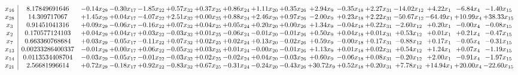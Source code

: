 \documentclass[9pt]{article}
\begin{document}
 \[\begin{array}{c| c c@{\hskip 2pt} c@{\hskip 2pt} c@{\hskip 2pt} c@{\hskip 2pt} c@{\hskip 2pt} c@{\hskip 2pt} c@{\hskip 2pt} c@{\hskip 2pt} c@{\hskip 2pt} c@{\hskip 2pt} c@{\hskip 2pt} c@{\hskip 2pt} c@{\hskip 2pt} c@{\hskip 2pt} c@{\hskip 2pt} }
 x_{16}   &  8.17849691646 & -0.14 x_{29} & -0.30 x_{17} & -1.85 x_{22} & +  0.57 x_{32} & +  0.37 x_{25} & +  0.86 x_{24} & +  1.11 x_{20} & +  0.35 x_{26} & +  2.94 x_{9} & -0.35 x_{18} & +  2.27 x_{31} & -14.02 x_{12} & +  4.22 x_{1} & -6.84 x_{4} & -1.40 x_{15}\\
 x_{28}   &  14.309717067 & +  1.45 x_{29} & +  0.04 x_{17} & -4.07 x_{22} & +  2.51 x_{32} & +  0.00 x_{25} & +  0.88 x_{24} & +  2.46 x_{20} & +  0.97 x_{26} & -2.00 x_{9} & +  0.23 x_{18} & +  2.22 x_{31} & -50.67 x_{12} & -64.49 x_{1} & + 10.99 x_{4} & + 38.33 x_{15}\\
 x_{3}   &  0.91451041316 & +  0.09 x_{29} & -0.06 x_{17} & -0.16 x_{22} & +  0.07 x_{32} & +  0.04 x_{25} & +  0.05 x_{24} & +  0.20 x_{20} & +  0.00 x_{26} & +  1.34 x_{9} & -0.04 x_{18} & +  0.22 x_{31} & -2.60 x_{12} & +  0.20 x_{1} & -0.00 x_{4} & -0.08 x_{15}\\
 x_{2}   &  0.170577124103 & +  0.04 x_{29} & +  0.04 x_{17} & +  0.03 x_{22} & -0.03 x_{32} & +  0.01 x_{25} & -0.06 x_{24} & -0.01 x_{20} & -0.01 x_{26} & +  0.50 x_{9} & +  0.04 x_{18} & +  0.01 x_{31} & +  0.53 x_{12} & +  0.01 x_{1} & +  0.21 x_{4} & -0.47 x_{15}\\
 x_{7}   &  0.663360768684 & +  0.03 x_{29} & -0.05 x_{17} & -0.11 x_{22} & +  0.07 x_{32} & +  0.02 x_{25} & +  0.02 x_{24} & +  0.13 x_{20} & -0.02 x_{26} & +  0.59 x_{9} & -0.00 x_{18} & +  0.17 x_{31} & -0.88 x_{12} & +  0.17 x_{1} & -0.05 x_{4} & -0.31 x_{15}\\
 x_{13}   &  0.00233286400337 & -0.01 x_{29} & +  0.00 x_{17} & +  0.06 x_{22} & -0.05 x_{32} & +  0.03 x_{25} & +  0.01 x_{24} & -0.00 x_{20} & -0.01 x_{26} & +  1.13 x_{9} & +  0.01 x_{18} & +  0.02 x_{31} & +  0.54 x_{12} & +  1.24 x_{1} & +  0.07 x_{4} & -1.19 x_{15}\\
 x_{14}   &  0.0113534408704 & -0.03 x_{29} & -0.05 x_{17} & -0.01 x_{22} & -0.03 x_{32} & +  0.02 x_{25} & -0.02 x_{24} & +  0.04 x_{20} & -0.03 x_{26} & +  0.60 x_{9} & -0.06 x_{18} & +  0.08 x_{31} & -0.20 x_{12} & +  2.00 x_{1} & -0.91 x_{4} & -1.97 x_{15}\\
 x_{21}   &  2.56681996614 & +  0.72 x_{29} & -0.18 x_{17} & +  0.92 x_{22} & -0.83 x_{32} & +  0.67 x_{25} & -0.31 x_{24} & -0.24 x_{20} & -0.43 x_{26} & + 30.72 x_{9} & +  0.52 x_{18} & +  0.20 x_{31} & +  7.78 x_{12} & + 14.94 x_{1} & + 20.00 x_{4} & -22.60 x_{15}\\

\end{array}\]
\end{document}
